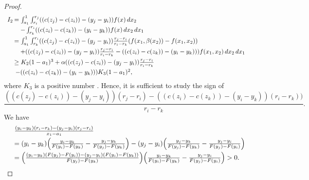 \documentclass[12pt,reqno]{amsart}
\begin{document}
\begin{proof}
\begin{equation}
\begin{array}{ll}
I_2\hspace{-8pt}&=\int_{a_1}^1\int_{r_i}^{r_j}((c(z_j)-c(z_i))-(y_j-y_i))f(x)\,dx_2\vspace{3pt}\\
&\quad -\int_{r_k}^{r_i}((c(z_i)-c(z_k))-(y_i-y_k))f(x)\,dx_2\,dx_1 \vspace{3pt}\\
&=\int_{a_1}^1\int_{r_k}^{r_i}((c(z_j)-c(z_i))-(y_j-y_i))\frac{r_j-r_i}{r_i-r_k}(f(x_1,\beta(x_2))-f(x_1,x_2))\vspace{3pt}\\
& \quad+((c(z_j)-c(z_i))-(y_j-y_i))\frac{r_j-r_i}{r_i-r_k}-((c(z_i)-c(z_k))-(y_i-y_k)))f(x_1,x_2)\,dx_2\,dx_1\vspace{3pt}\\
&\ge K_2(1-a_1)^3+\alpha((c(z_j)-c(z_i))-(y_j-y_i))\frac{r_j-r_i}{r_i-r_k}\vspace{3pt}\\
&\hspace{-8pt}\quad -((c(z_i)-c(z_k))-(y_i-y_k)))K_3(1-a_1)^2,
\end{array}
\end{equation}
where $K_3$ is a positive number . Hence, it is sufficient to study the sign of  
\[\frac{((c(z_j)-c(z_i))-(y_j-y_i))(r_j-r_i)-((c(z_i)-c(z_k))-(y_i-y_k))(r_i-r_k))}{r_i-r_k}.\]
We have 
\[\begin{array}{ll}
&\frac{(y_i-y_k)(r_i-r_k)-(y_j-y_i)(r_j-r_i)}{x_1-a_1}\vspace{3pt}\\
&=(y_i-y_k)\Big(\frac{y_i-y_k}{F(y_i)-F(y_k)}-\frac{y_j-y_k}{F(y_j)-F(y_k)}\Big)-(y_j-y_i)\Big(\frac{y_j-y_k}{F(y_j)-F(y_k)}-\frac{y_j-y_i}{F(y_j)-F(y_i)}\Big)\vspace{3pt}\\
&= \Big(\frac{(y_i-y_k)(F(y_j)-F(y_i))-(y_j-y_i)(F(y_i)-F(y_k))}{F(y_j)-F(y_k)}\Big)\Big(\frac{y_i-y_k}{F(y_i)-F(y_k)}-\frac{y_j-y_i}{F(y_j)-F(y_i)}\Big)>0.




\end{array}\]
\end{proof}
\end{document}
